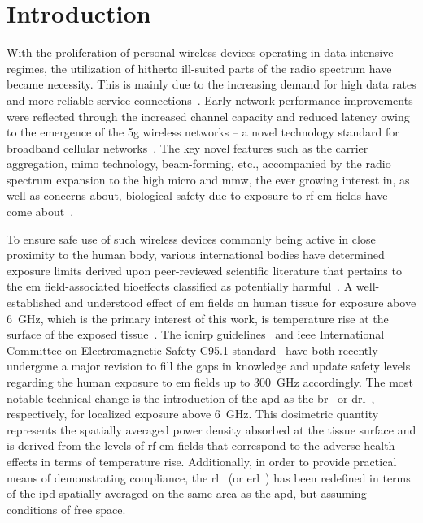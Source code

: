 \chapter{Introduction}

With the proliferation of personal wireless devices operating in data-intensive regimes, the utilization of hitherto ill-suited parts of the radio spectrum have became necessity.
This is mainly due to the increasing demand for high data rates and more reliable service connections~\cite{Wu2015Safe}.
Early network performance improvements were reflected through the increased channel capacity and reduced latency owing to the emergence of the \gls{5g} wireless networks -- a novel technology standard for broadband cellular networks~\cite{Andrews2014What}.
The key novel features such as the carrier aggregation, \gls{mimo} technology, beam-forming, etc., accompanied by the radio spectrum expansion to the high micro and \gls{mmw}, the ever growing interest in, as well as concerns about, biological safety due to exposure to \gls{rf} \gls{em} fields have come about~\cite{Zhadobov2011Millimeter}.

To ensure safe use of such wireless devices commonly being active in close proximity to the human body, various international bodies have determined exposure limits derived upon peer-reviewed scientific literature that pertains to the \gls{em} field-associated bioeffects classified as potentially harmful~\cite{ICNIRP2020Principles}.
A well-established and understood effect of \gls{em} fields on human tissue for exposure above \SI{6}{\GHz}, which is the primary interest of this work, is temperature rise at the surface of the exposed tissue~\cite{Ziskin2018Tissue}.
The \gls{icnirp} guidelines~\cite{ICNIRP2020Guidelines} and \gls{ieee} International Committee on Electromagnetic Safety C95.1 standard~\cite{IEEE2019Standard} have both recently undergone a major revision to fill the gaps in knowledge and update safety levels regarding the human exposure to \gls{em} fields up to \SI{300}{\GHz} accordingly.
The most notable technical change is the introduction of the \gls{apd} as the \gls{br}~\cite{ICNIRP2020Guidelines} or \gls{drl}~\cite{IEEE2019Standard}, respectively, for localized exposure above \SI{6}{\GHz}.
This dosimetric quantity represents the spatially averaged power density absorbed at the tissue surface and is derived from the levels of \gls{rf} \gls{em} fields that correspond to the adverse health effects in terms of temperature rise.
Additionally, in order to provide practical means of demonstrating compliance, the \gls{rl}~\cite{ICNIRP2020Guidelines} (or \gls{erl}~\cite{IEEE2019Standard}) has been redefined in terms of the \gls{ipd} spatially averaged on the same area as the \gls{apd}, but assuming conditions of free space.

